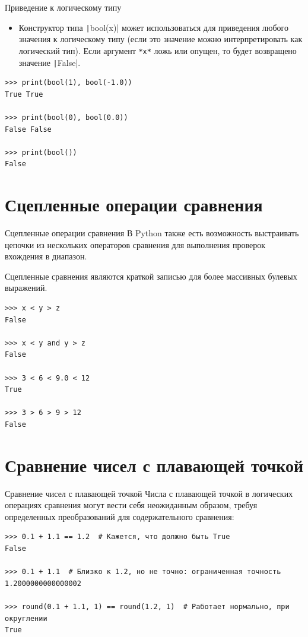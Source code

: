 \documentclass[aspectratio=169]{beamer}	%
\begin{document}
\begin{frame}[fragile]{Приведение к логическому типу}
\scriptsize
\begin{itemize}
	\item Конструктор типа \texttt|bool(x)| может использоваться для приведения любого значения к логическому типу (если это значение можно интерпретировать как логический тип). Если аргумент \texttt{*x*} ложь или опущен, то будет возвращено значение \texttt|False|.
\end{itemize}

\begin{verbatim}
>>> print(bool(1), bool(-1.0))
True True

>>> print(bool(0), bool(0.0))
False False

>>> print(bool())
False
\end{verbatim}
\vfill
\end{frame}

\section{Сцепленные операции сравнения}
\sectionframe


\begin{frame}[fragile]{Сцепленные операции сравнения}
\scriptsize
В Python также есть возможность выстраивать цепочки из нескольких операторов сравнения для выполнения проверок вхождения в диапазон. 

Сцепленные сравнения являются краткой записью для более массивных булевых выражений.

\begin{verbatim}
>>> x < y > z
False

>>> x < y and y > z
False

>>> 3 < 6 < 9.0 < 12
True

>>> 3 > 6 > 9 > 12
False
\end{verbatim}
\vfill
\end{frame}


\section{Сравнение чисел с плавающей точкой}
\sectionframe


\begin{frame}[fragile]{Сравнение чисел с плавающей точкой}
\scriptsize
Числа с плавающей точкой в логических операциях сравнения могут вести себя неожиданным образом, требуя определенных преобразований для содержательного сравнения:

\begin{verbatim}
>>> 0.1 + 1.1 == 1.2  # Кажется, что должно быть True 
False

>>> 0.1 + 1.1  # Близко к 1.2, но не точно: ограниченная точность
1.2000000000000002

>>> round(0.1 + 1.1, 1) == round(1.2, 1)  # Работает нормально, при округлении
True
\end{verbatim}
\vfill
\end{frame}
\end{document}

